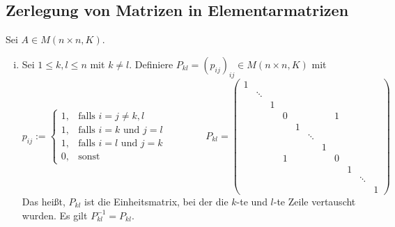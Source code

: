 \subsection{Zerlegung von Matrizen in Elementarmatrizen}

\begin{definition}[Elementarmatrizen]
	\label{def:I.7.1}
	Sei $A \in M(n \times n,K)$. 
	\begin{enumerate}[(i)]
		\item	Sei $1 \leq k,l \leq n$ mit $k \neq l$.
		Definiere $P_{kl} = (p_{ij})_{ij} \in M(n \times n,K)$ mit
		\[ p_{ij} := \begin{cases}
			1, & \text{falls } i = j \neq k,l \\
			1, & \text{falls } i=k \text{ und } j=l \\
			1, & \text{falls } i=l \text{ und } j=k \\
			0, & \text{sonst}
		\end{cases} \qquad \qquad
		P_{kl} =
			\begin{pmatrix}
				1 &  &  &  &  &  &  &  &  &  &  \\ 
				& \ddots &  &  &  &  &  &  &  &  &  \\ 
				&  & 1 &  &  &  &  &  &  &  &  \\ 
				&  &  & 0 &  &  &  & 1 &  &  &  \\ 
				&  &  &  & 1 &  &  &  &  &  &  \\ 
				&  &  &  &  & \ddots &  &  &  &  &  \\ 
				&  &  &  &  &  & 1 &  &  &  &  \\ 
				&  &  & 1 &  &  &  & 0 &  &  &  \\ 
				&  &  &  &  &  &  &  & 1 &  &  \\ 
				&  &  &  &  &  &  &  &  & \ddots &  \\ 
				&  &  &  &  &  &  &  &  &  & 1
				\end{pmatrix}
		\]
		Das heißt, $P_{kl}$ ist die Einheitsmatrix, bei der die $k$-te und $l$-te Zeile vertauscht wurden.
		Es gilt $P_{kl}^{-1} = P_{kl}$.
		

\end{enumerate}
\end{definition}
